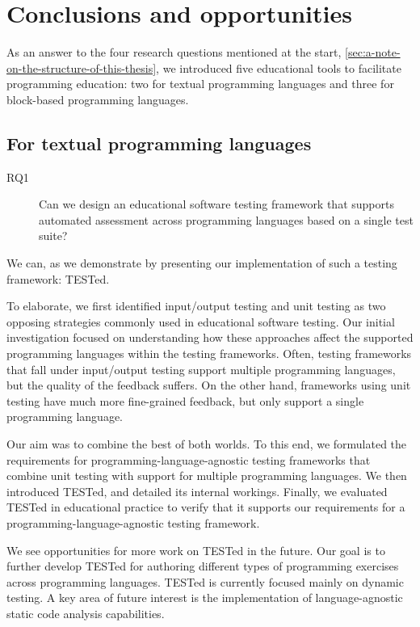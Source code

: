 \documentclass[main]{subfiles}
\begin{document}
\chapter{Conclusions and opportunities}\label{ch:conclusions-and-opportunities}

As an answer to the four research questions mentioned at the start, \cref{sec:a-note-on-the-structure-of-this-thesis},
we introduced five educational tools to facilitate programming education:
two for textual programming languages and three for block-based programming languages.

\section{For textual programming languages}\label{sec:for-textual-programming-languages}

\begin{description}
    \item[RQ1] Can we design an educational software testing framework that supports automated assessment across programming languages based on a single test suite?
\end{description}

We can, as we demonstrate by presenting our implementation of such a testing framework: TESTed.

To elaborate, we first identified input/output testing and unit testing as two opposing strategies commonly used in educational software testing.
Our initial investigation focused on understanding how these approaches affect the supported programming languages within the testing frameworks.
Often, testing frameworks that fall under input/output testing support multiple programming languages, but the quality of the feedback suffers.
On the other hand, frameworks using unit testing have much more fine-grained feedback, but only support a single programming language.

Our aim was to combine the best of both worlds.
To this end, we formulated the requirements for programming-language-agnostic testing frameworks that combine unit testing with support for multiple programming languages.
We then introduced TESTed, and detailed its internal workings.
Finally, we evaluated TESTed in educational practice to verify that it supports our requirements for a programming-language-agnostic testing framework.

We see opportunities for more work on TESTed in the future.
Our goal is to further develop TESTed for authoring different types of programming exercises across programming languages.
TESTed is currently focused mainly on dynamic testing.
A key area of future interest is the implementation of language-agnostic static code analysis capabilities.
\end{document}
